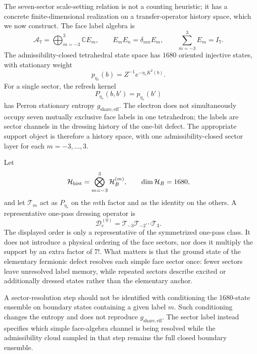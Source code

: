 \documentclass[11pt]{article}
\begin{document}
The seven-sector scale-setting relation is not a counting heuristic; it has a concrete finite-dimensional realization on a transfer-operator history space, which we now construct. The face label algebra is
\[
\mathcal A_7=\bigoplus_{m=-3}^{3}\mathbb C E_m,
\qquad
E_mE_n=\delta_{mn}E_m,
\qquad
\sum_{m=-3}^{3}E_m=I_7.
\]
The admissibility-closed tetrahedral state space has $1680$ oriented injective states, with stationary weight
\[
p_{\eta_*}(b)=Z^{-1}e^{-\eta_*K^2(b)}.
\]
For a single sector, the refresh kernel
\[
P_{\eta_*}(b,b')=p_{\eta_*}(b')
\]
has Perron stationary entropy $g_{\mathrm{share,eff}}$. The electron does not simultaneously occupy seven mutually exclusive face labels in one tetrahedron; the labels are sector channels in the dressing history of the one-bit defect. The appropriate support object is therefore a history space, with one admissibility-closed sector layer for each $m=-3,\ldots,3$.

Let
\[
\mathcal H_{\rm hist}
=
\bigotimes_{m=-3}^{3}\mathcal H_B^{(m)},
\qquad
\dim \mathcal H_B=1680,
\]
and let $\mathcal T_m$ act as $P_{\eta_*}$ on the $m$th factor and as the identity on the others. A representative one-pass dressing operator is
\[
\mathcal D_e^{(0)}
=
\mathcal T_{-3}\mathcal T_{-2}\cdots\mathcal T_{3}.
\]
The displayed order is only a representative of the symmetrized one-pass class. It does not introduce a physical ordering of the face sectors, nor does it multiply the support by an extra factor of $7!$. What matters is that the ground state of the elementary fermionic defect resolves each simple face sector once: fewer sectors leave unresolved label memory, while repeated sectors describe excited or additionally dressed states rather than the elementary anchor.

A sector-resolution step should not be identified with conditioning the
1680-state ensemble on boundary states containing a given label $m$.  Such
conditioning changes the entropy and does not reproduce
$g_{\mathrm{share,eff}}$.  The sector label instead specifies which simple
face-algebra channel is being resolved while the admissibility cloud sampled
in that step remains the full closed boundary ensemble.
\end{document}
